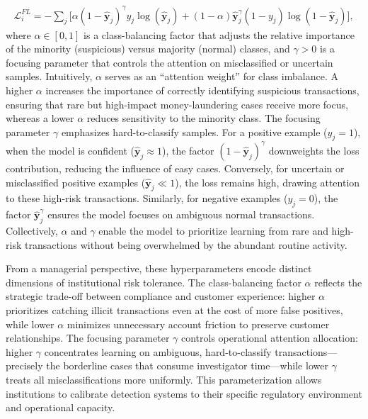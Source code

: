 \begin{align}
\label{focal_loss}
    \mathcal{L}_i^{FL} = - \sum_j \big[\alpha(1 - \hat{\mathbf{y}}_j)^{\gamma} y_j \log(\hat{\mathbf{y}}_j) + (1-\alpha)\hat{\mathbf{y}}_j^{\gamma} (1-y_j) \log(1-\hat{\mathbf{y}}_j)\big],
\end{align}
where $\alpha \in [0,1]$ is a class-balancing factor that adjusts the relative importance of the minority (suspicious) versus majority (normal) classes, and $\gamma > 0$ is a focusing parameter that controls the attention on misclassified or uncertain samples. Intuitively, $\alpha$ serves as an ``attention weight'' for class imbalance. A higher $\alpha$ increases the importance of correctly identifying suspicious transactions, ensuring that rare but high-impact money-laundering cases receive more focus, whereas a lower $\alpha$ reduces sensitivity to the minority class. The focusing parameter $\gamma$ emphasizes hard-to-classify samples. For a positive example ($y_j = 1$), when the model is confident (\(\hat{\mathbf{y}}_j \approx 1\)), the factor $(1-\hat{\mathbf{y}}_j)^\gamma$ downweights the loss contribution, reducing the influence of easy cases. Conversely, for uncertain or misclassified positive examples (\(\hat{\mathbf{y}}_j \ll 1\)), the loss remains high, drawing attention to these high-risk transactions. Similarly, for negative examples ($y_j = 0$), the factor $\hat{\mathbf{y}}_j^\gamma$ ensures the model focuses on ambiguous normal transactions. Collectively, $\alpha$ and $\gamma$ enable the model to prioritize learning from rare and high-risk transactions without being overwhelmed by the abundant routine activity.

From a managerial perspective, these hyperparameters encode distinct dimensions of institutional risk tolerance. The class-balancing factor $\alpha$ reflects the strategic trade-off between compliance and customer experience: higher $\alpha$ prioritizes catching illicit transactions even at the cost of more false positives, while lower $\alpha$ minimizes unnecessary account friction to preserve customer relationships. The focusing parameter $\gamma$ controls operational attention allocation: higher $\gamma$ concentrates learning on ambiguous, hard-to-classify transactions—precisely the borderline cases that consume investigator time—while lower $\gamma$ treats all misclassifications more uniformly. This parameterization allows institutions to calibrate detection systems to their specific regulatory environment and operational capacity.


